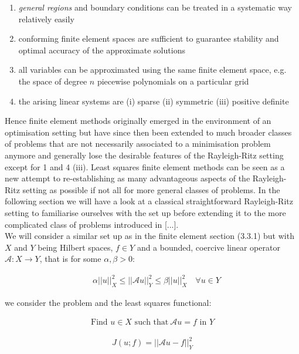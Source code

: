 \documentclass[../draft_1.tex]{subfiles}
\begin{document}
\begin{enumerate}
	\item \textit{general regions} and boundary conditions can be treated in a systematic way relatively easily
	\item conforming finite element spaces are sufficient to guarantee stability and optimal accuracy of the approximate solutions
	\item all variables can be approximated using the same finite element space, e.g. the space of degree $n$ piecewise polynomials on a particular grid
	\item the arising linear systems are 
	\subitem (i) sparse
	\subitem (ii) symmetric
	\subitem (iii) positive definite
\end{enumerate}

Hence finite element methods originally emerged in the environment of an optimisation setting but have since then been extended to much broader classes of problems that are not necessarily associated to a minimisation problem anymore and generally lose the desirable features of the Rayleigh-Ritz setting except for 1 and 4 (iii). Least squares finite element methods can be seen as a new attempt to re-establishing as many advantageous aspects of the Rayleigh-Ritz setting as possible if not all for more general classes of problems. In the following section we will have a look at a classical straightforward Rayleigh-Ritz setting to familiarise ourselves with the set up before extending it to the more complicated class of problems introduced in [...]. 
\smallskip
\\
We will consider a similar set up as in the finite element section (3.3.1) but with $X$ and $Y$ being Hilbert spaces, $f \in Y$ and a bounded, coercive linear operator $\mathcal{A}: X \rightarrow Y$, that is for some  $\alpha, \beta > 0$:
\begin{ceqn}
\begin{align}
\quad \alpha || u ||_X^2 \leq || \mathcal{A} u ||_Y^2 \leq \beta || u ||_X^2 \quad \forall u \in Y
\end{align} 
\end{ceqn}
we consider the problem and the least squares functional:
\begin{ceqn}
\begin{align}
 \text{Find } u \in X  \text{ such that} \ \mathcal{A} u = f \text{ in } Y	
\end{align}

\begin{align}
J(u; f) = || \mathcal{A} u - f ||_Y^2
\end{align}
\end{ceqn}
\end{document}
